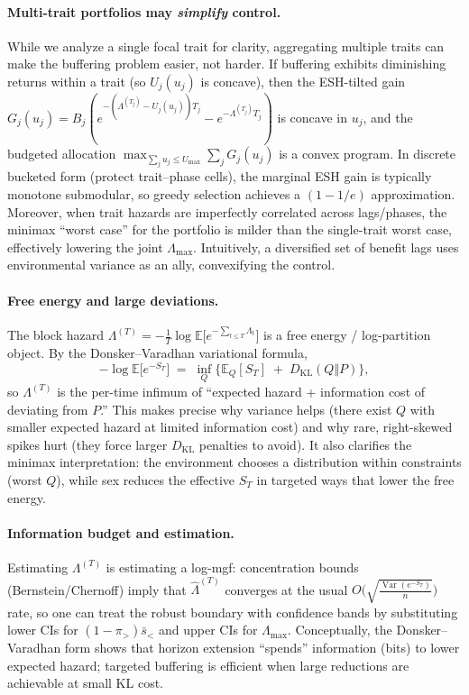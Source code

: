 \documentclass[11pt]{article}
\theoremstyle{upright}
\newcommand{\E}{\mathbb{E}}
\newcommand{\Var}{\operatorname{Var}}
\newcommand{\horizon}{\Lambda}
\newcommand{\Lmax}{\horizon^{(T)}_{\max}}
\newcommand{\hazT}[1]{\Lambda^{(#1)}}          %
\renewcommand{\Lmax}{\Lambda_{\max}}
\begin{document}
\paragraph{Multi-trait portfolios may \emph{simplify} control.}
While we analyze a single focal trait for clarity, aggregating multiple traits can make the buffering problem easier, not harder. If buffering exhibits diminishing returns within a trait (so $U_j(u_j)$ is concave), then the ESH-tilted gain $G_j(u_j)=B_j\!\left(e^{-(\Lambda^{(T_j)}-U_j(u_j))T_j}-e^{-\Lambda^{(T_j)}T_j}\right)$ is concave in $u_j$, and the budgeted allocation $\max_{\sum_j u_j\le U_{\max}}\sum_j G_j(u_j)$ is a convex program. In discrete bucketed form (protect trait–phase cells), the marginal ESH gain is typically monotone submodular, so greedy selection achieves a $(1-1/e)$ approximation. Moreover, when trait hazards are imperfectly correlated across lags/phases, the minimax ``worst case'' for the portfolio is milder than the single-trait worst case, effectively lowering the joint $\Lambda_{\max}$. Intuitively, a diversified set of benefit lags uses environmental variance as an ally, convexifying the control.

\paragraph{Free energy and large deviations.}
The block hazard $\hazT{T}=-\tfrac1T\log \E\big[e^{-\sum_{t\le T}\Lambda_t}\big]$ is a free energy / log-partition
object. By the Donsker--Varadhan variational formula,
\[
-\log \E\big[e^{-S_T}\big] \;=\; \inf_{Q}\Big\{\E_Q[S_T] \;+\; D_{\mathrm{KL}}(Q\Vert P)\Big\},
\]
so $\hazT{T}$ is the per-time infimum of ``expected hazard + information cost of deviating from $P$.''
This makes precise why variance helps (there exist $Q$ with smaller expected hazard at limited information cost)
and why rare, right-skewed spikes hurt (they force larger $D_{\mathrm{KL}}$ penalties to avoid).
It also clarifies the minimax interpretation: the environment chooses a distribution within constraints (worst $Q$),
while sex reduces the effective $S_T$ in targeted ways that lower the free energy.

\paragraph{Information budget and estimation.}
Estimating $\hazT{T}$ is estimating a log-mgf: concentration bounds (Bernstein/Chernoff) imply that
$\widehat{\Lambda}^{(T)}$ converges at the usual $O\!\big(\sqrt{\tfrac{\Var(e^{-S_T})}{n}}\big)$ rate, so one can
treat the robust boundary with confidence bands by substituting lower CIs for $(1-\pi_>)\bar s_{<}$ and upper CIs for
$\Lmax$. Conceptually, the Donsker--Varadhan form shows that horizon extension “spends” information (bits) to lower
expected hazard; targeted buffering is efficient when large reductions are achievable at small KL cost.
\end{document}
